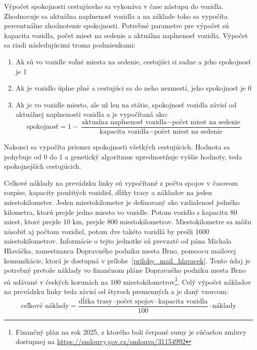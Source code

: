 Výpočet spokojnosti cestujúceho sa vykonáva v čase nástupu do vozidla. Zhodnocuje sa aktuálna naplnenosť vozidla a na základe toho sa vypočíta percentuálne zhodnotenie spokojnosti.
Potrebné parametre pre výpočet sú kapacita vozidla, počet miest na sedenie a aktuálna naplnenosť vozidla.
Výpočet sa riadi následujúcimi troma podmienkami:
\begin{enumerate}
  \item Ak sú vo vozidle voľné miesta na sedenie, cestujúci si sadne a jeho spokojnosť je 1
  \item Ak je vozidlo úplne plné a cestujúci sa do neho nezmestí, jeho spokojnosť je 0
  \item Ak je vo vozidle miesto, ale už len na státie, spokojnosť vozidla závisí od aktuálnej naplnenosti vozidla a je vypočítaná ako: \begin{equation}
      \text{spokojnosť} = 1 - \frac{\text{aktualna naplnenosť vozidla} - \text{počet miest na sedenie}}{\text{kapacita vozidla}  - \text{počet miest na sedenie}}
    \end{equation}
\end{enumerate}
Nakonci sa vypočíta priemer spokojnosti všetkých cestujúcich.
Hodnota sa pohybuje od 0 do 1 a genetický algoritmus uprednostňuje vyššie hodnoty, teda spokojnejších cestujúcich.

Celkové náklady na prevádzku linky sú vypočítané z počtu spojov v časovom rozpise, kapacity použitých vozidiel, dĺžky trasy a nákladov na jeden miestokilometer.
Jeden miestokilometer je definovaný ako vzdialenosť jedného kilometra, ktorú prejde jedno miesto vo vozidle.
Potom vozidlo s kapacitu 80 miest, ktoré prejde 10 km, prejde 800 miestokilometrov.
Miestokilometre sa môžu násobiť aj počtom vozidiel, potom dve takéto vozidlá by prešli 1600 miestokilometrov.
Informácie o tejto jednotke sú prevzaté od pána Michala Hlaváčka, zamestnanca Dopravného podniku mesta Brno, pomoocu mailovej komunikácie, ktorá je dostupná v prílohe~\ref{prilohy_mail_hlavacek}.
Tento údaj je potrebný pretože náklady vo finančnom pláne Dopravného podniku mesta Brno sú udávané v českých korunách na 100 miestokilometrov\footnote{Finančný plán na rok 2025, z ktorého boli čerpané sumy je súčasťou zmluvy dostupnej na \url{https://smlouvy.gov.cz/smlouva/31154992}}.
Celý výpočet nákladov na prevádzku linky teda závisí od štyroch premenných a je daný vzorcom:
\begin{equation}
  \text{ceľkové náklady} = \frac{\text{dĺžka trasy} \cdot \text{počet spojov} \cdot \text{kapacita vozidla}}{100} \cdot \text{náklady}
\end{equation}


